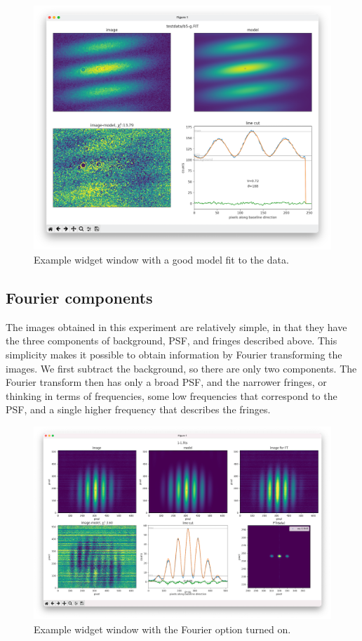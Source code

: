 \documentclass[11pt]{article}
\begin{document}
\begin{figure}[h]
    \centering
    \includegraphics[width=1\textwidth]{widget2.png}
    \caption{Example widget window with a good model fit to the data.}
    \label{fig:widget2}
\end{figure}

\subsection{Fourier components}

The images obtained in this experiment are relatively simple, in that they have the three components of background, PSF, and fringes described above. This simplicity makes it possible to obtain information by Fourier transforming the images. We first subtract the background, so there are only two components. The Fourier transform then has only a broad PSF, and the narrower fringes, or thinking in terms of frequencies, some low frequencies that correspond to the PSF, and a single higher frequency that describes the fringes.

\begin{figure}[h]
    \centering
   \includegraphics[width=1\textwidth]{widget-fourier.png}
    \caption{Example widget window with the Fourier option turned on.}
    \label{fig:widget-f}
\end{figure}
\end{document}
